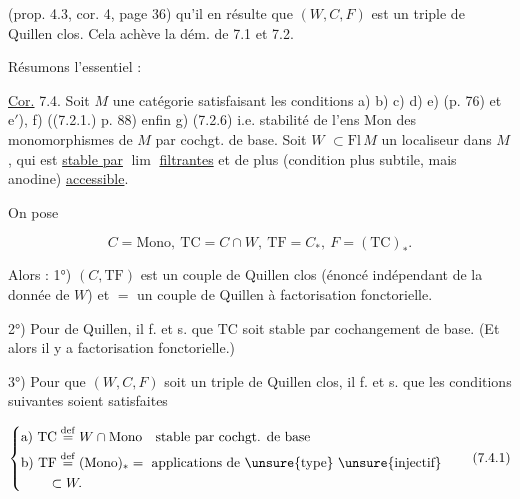 

(prop. 4.3, cor. 4, page 36) qu'il en résulte que $(W,C,F)$ est un triple de Quillen clos. Cela achève la dém. de 7.1 et 7.2.

Résumons l'essentiel :


\uline{Cor.} 7.4. Soit $M$ une catégorie satisfaisant les conditions a) b) c) d) e) (p. 76) et e$'$), f) ((7.2.1.) p. 88) enfin g) (7.2.6) i.e. stabilité de l'ens $\mathrm{Mon}$ des monomorphismes de $M$ par cochgt. de base. Soit $W$  $\subset\mathrm{Fl}\,M$ un localiseur dans $M$, qui est \uline{stable par} \uline{$\lim$} \uline{filtrantes} et de plus (condition plus subtile, mais  anodine) \uline{accessible}.

On pose

\[
C=\mathrm{Mono},\ \mathrm{TC}=C\cap W,\ \mathrm{TF}=C_*,\ F=(\mathrm{TC})_*.
\]

Alors : 1°) $(C,\mathrm{TF})$ est un couple de Quillen clos (énoncé indépendant de la donnée de $W$) et $=$ un couple de Quillen à factorisation fonctorielle.


2°) Pour   de Quillen, il f. et s. que $\mathrm{TC}$ soit stable par cochangement de base. (Et alors il y a factorisation fonctorielle.)

3°) Pour que $(W,C,F)$ soit un triple de Quillen clos, il f. et s. que les conditions suivantes soient satisfaites

\[
\left\{\begin{aligned}
&\text{a) }\mathrm{TC}\overset{\mathrm{def}}{=}W\cap\mathrm{Mono}\quad\text{stable par cochgt. de base}\\
&\text{b) }\mathrm{TF}\overset{\mathrm{def}}{=}(\mathrm{Mono})_*=\text{ applications de \unsure{type} \unsure{injectif}}\\
&\qquad\subset W.
\end{aligned}\right.\tag*{(7.4.1)}
\]
